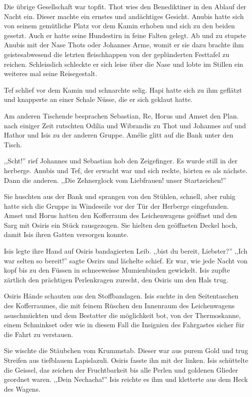 Die übrige Gesellschaft war topfit. Thot wies den Benediktiner in den Ablauf der Nacht ein. Dieser machte ein ernstes und andächtiges Gesicht. Anubis hatte sich von seinem gemütliche Platz vor dem Kamin erhoben und sich zu den beiden gesetzt. Auch er hatte seine Hundestirn in feine Falten gelegt. Ab und zu stupste Anubis mit der Nase Thots oder Johannes Arme, womit er sie dazu brachte ihm geistesabwesend die letzten fleischhappen von der geplünderten Festtafel zu reichen. Schleisslich schleckte er sich leise über die Nase und lobte im Stillen ein weiteres mal seine Reisegestalt.

Tef schlief vor dem Kamin und schnarchte selig. Hapi hatte sich zu ihm geflätzt und knapperte an einer Schale Nüsse, die er sich geklaut hatte. 

Am anderen Tischende besprachen Sebastian, Re, Horus und Amset den Plan. nach einiger Zeit rutschten Odilia und Wibrandis zu Thot und Johannes auf und Hathor und Isis zu der anderen Gruppe. Amélie glitt auf die Bank unter den Tisch.

,,Scht!'' rief Johannes und Sebastian hob den Zeigefinger. Es wurde still in der herberge. Anubis und Tef, der erwacht war und sich reckte, hörten es als nächste. Dann die anderen. ,,Die Zehnerglock vom Liebfrauen! unser Startzeichen!'' 

Sie huschten aus der Bank und sprangen von den Stühlen, schnell, aber ruhig hatte sich die Gruppe in Windeseile vor der Tür der Herberge eingefunden. Amset und Horus hatten den Kofferraum des Leichenwagens geöffnet und den Sarg mit Osiris ein Stück rausgezogen. Sie hielten den geöffneten Deckel hoch, damit Isis ihren Gatten versorgen konnte.

Isis legte ihre Hand auf Osiris bandagierten Leib. ,,bist du bereit, Liebster?'' ,,Ich war selten so bereit!'' sagte Osrirs und lächelte schief. Er war, wie jede Nacht von kopf bis zu den Füssen in schneeweisse Mumienbinden gewickelt. Isis zupfte zärtlich den prächtigen Perlenkragen zurecht, den Osiris um den Hals trug.

Osiris Hände schauten aus den Stoffbandagen. Isis suchte in den Seitentaschen des Kofferraumes, die mit feinem Rüschen den Innenraum des Leichenwagens asuschmückten und dem Bestatter die möglichkeit bot, von der Thermoskanne, einem Schminkset oder wie in diesem Fall die Insignien des Fahrgastes sicher für die Fahrt zu verstauen.

Sie wischte die Stäubchen vom Krummstab. Dieser war aus purem Gold und trug Streifen aus tiefblauem Lapislazuli. Osiris fasste ihn mit der linken. Isis schüttelte die Geissel, das zeichen der Fruchtbarkeit bis alle Perlen und goldenen Glieder geordnet waren. ,,Dein Nechacha!'' Isis reichte es ihm und kletterte aus dem Heck des Wagens.

